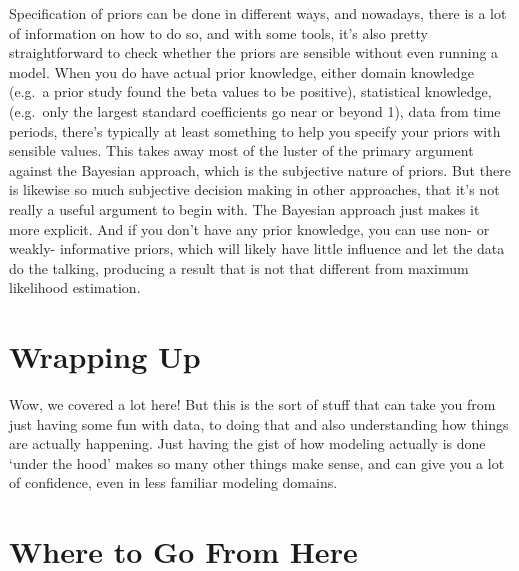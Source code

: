 \documentclass[
  letterpaper,
]{krantz}
\begin{document}
\begin{tcolorbox}[enhanced jigsaw, toprule=.15mm, colback=white, breakable, rightrule=.15mm, arc=.35mm, bottomrule=.15mm, opacityback=0, colframe=quarto-callout-tip-color-frame, leftrule=.75mm, left=2mm]
\begin{minipage}[t]{5.5mm}
\textcolor{quarto-callout-tip-color}{\faLightbulb}
\end{minipage}%
\begin{minipage}[t]{\textwidth - 5.5mm}

Specification of priors can be done in different ways, and nowadays,
there is a lot of information on how to do so, and with some tools, it's
also pretty straightforward to check whether the priors are sensible
without even running a model. When you do have actual prior knowledge,
either domain knowledge (e.g.~a prior study found the beta values to be
positive), statistical knowledge, (e.g.~only the largest standard
coefficients go near or beyond 1), data from time periods, there's
typically at least something to help you specify your priors with
sensible values. This takes away most of the luster of the primary
argument against the Bayesian approach, which is the subjective nature
of priors. But there is likewise so much subjective decision making in
other approaches, that it's not really a useful argument to begin with.
The Bayesian approach just makes it more explicit. And if you don't have
any prior knowledge, you can use non- or weakly- informative priors,
which will likely have little influence and let the data do the talking,
producing a result that is not that different from maximum likelihood
estimation.

\end{minipage}%
\end{tcolorbox}

\section{Wrapping Up}\label{sec-estim-wrap}

Wow, we covered a lot here! But this is the sort of stuff that can take
you from just having some fun with data, to doing that and also
understanding how things are actually happening. Just having the gist of
how modeling actually is done `under the hood' makes so many other
things make sense, and can give you a lot of confidence, even in less
familiar modeling domains.

\section{Where to Go From Here}\label{sec-estim-where-to-go}
\end{document}
